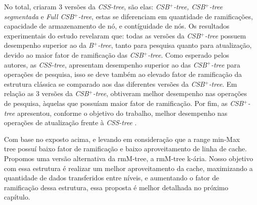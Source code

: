  No total, \citet{paper-making-btree-cache} criaram $3$ versões da \textit{CSS-tree}, são elas: \textit{CSB$^+$-tree, CSB$^+$-tree segmentada} e  \textit{Full CSB$^+$-tree}, estas se diferenciam em quantidade de ramificações, capacidade de armazenamento de nó, e contíguidade de nós. Os resultados experimentais do estudo revelaram que: todas as versões da \textit{CSB$^+$-tree} possuem desempenho superior ao da \textit{B$^+$-tree}, tanto para pesquisa quanto para atualização, devido ao maior fator de ramificação das \textit{CSB$^+$-tree}. Como esperado pelos autores, as \textit{CSS-tree}, apresentam desempenho superior ao das \textit{CSB$^+$-tree} para operações de pesquisa, isso se deve também ao elevado fator de ramificação da estrutura clássica se comparado aos das diferentes versões da \textit{CSB$^+$-tree}. Em relação as $3$ versões da \textit{CSB$^+$-tree}, obtiveram melhor desempenho nas operações de pesquisa, àquelas que possuíam maior fator de ramificação. Por fim, as \textit{CSB$^+$-tree} apresentou, conforme o objetivo do trabalho, melhor desempenho nas operações de atualização frente à \textit{CSS-tree} \citep{paper-making-btree-cache}.

Com base no exposto acima, e levando em consideração que a range min-Max tree possuí baixo fator de ramificação e baixo aproveitamento de linha de cache. Propomos uma versão alternativa da rmM-tree, a rmM-tree k-ária. Nosso objetivo com essa estrutura é  realizar um melhor aproveitamento da cache, maximizando a quantidade de dados transferidos entre níveis, e aumentando o fator de ramificação dessa estrutura, essa proposta é melhor detalhada no próximo capítulo.

